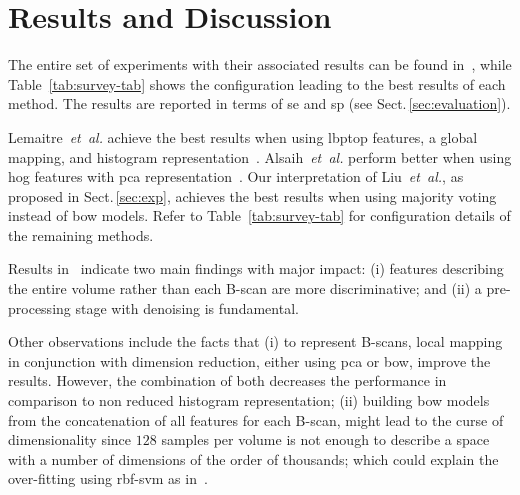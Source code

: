 \section{Results and Discussion}\label{sec:results}\label{sec:discussion}

The entire set of experiments with their associated results can be found in~\cite{rethinopaty20016apr-repoICPR}, while Table~\ref{tab:survey-tab} shows the configuration leading to the best results of each method.
The results are reported in terms of \gls{se} and \gls{sp} (see Sect.\,\ref{sec:evaluation}).

Lemaitre~\emph{et~al.} achieve the best results when using \gls{lbptop} features, a global mapping, and histogram representation~\cite{Lemaintre2015miccaiOCT}.
Alsaih~\emph{et~al.} perform better when using \gls{hog} features with \gls{pca} representation~\cite{Alsaih2016apr-repoICPR}.
Our interpretation of Liu~\emph{et~al.}, as proposed in Sect.\,\ref{sec:exp}, achieves the best results when using majority voting instead of \gls{bow} models.
Refer to Table~\ref{tab:survey-tab} for configuration details of the remaining methods.

Results in~\cite{rethinopaty20016apr-repoICPR} indicate two main findings with major impact:
(i) features describing the entire volume rather than each B-scan are more discriminative; and
(ii) a pre-processing stage with denoising is fundamental.

Other observations include the facts that
(i) to represent B-scans, local mapping in conjunction with dimension reduction, either using \gls{pca} or \gls{bow}, improve the results.
However, the combination of both decreases the performance in comparison to non reduced histogram representation;
(ii) building \gls{bow} models from the concatenation of all features for each B-scan, might lead to the curse of dimensionality since $128$ samples per volume is not enough to describe a space with a number of dimensions of the order of thousands; which could explain the over-fitting using \gls{rbf}-\gls{svm} as in~\cite{liu20016apr-repoICPR}.
